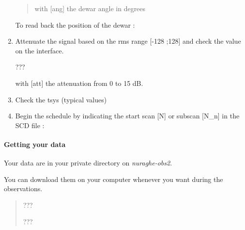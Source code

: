 \documentclass[letterpaper,10pt,english]{sphinxmanual}
\begin{document}
\begin{enumerate}
\begin{quote}
\begin{itemize}
\end{itemize}

     with {[}ang{]} the dewar angle in degrees
\end{quote}

To read back the position of the dewar :
\begin{quote}

\end{quote}

\item {} 
Attenuate the signal based on the rms range {[}-128 ;128{]} and check the value on the interface.

  ???

    with {[}att{]} the attenuation from 0 to 15 dB.

\item {} 
Check the tsys (typical values)
\begin{quote}

\end{quote}

\item {} 
Begin the schedule by indicating the start scan {[}N{]} or subscan {[}N\_n{]} in the SCD file :
\begin{quote}

\end{quote}

\end{enumerate}


\paragraph{Getting your data}
\label{Continuum/K-band/SARDARA/get-data:getting-your-data}\label{Continuum/K-band/SARDARA/get-data::doc}
Your data are in your private directory on \emph{nuraghe-obs2}.

You can download them on your computer whenever you want during the observations.
\begin{quote}

  ???

 ???
\end{quote}
\end{document}
